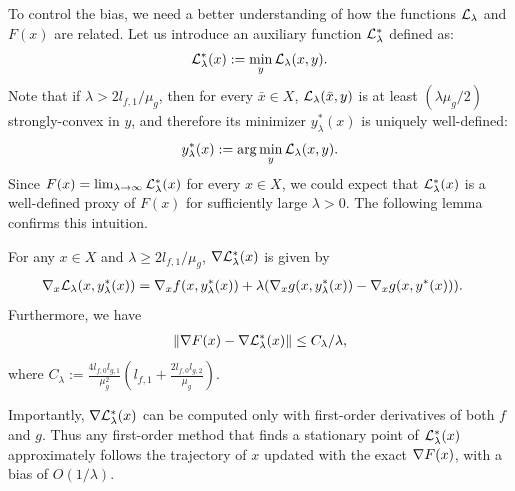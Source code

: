 To control the bias, we need a better understanding of how the functions $\mathcal{L}_{\lambda}$ and $F(x)$ are related. 
Let us introduce an auxiliary function $\mathcal{L}_{\lambda}^*$ defined as:
\begin{align*}
    \mathcal{L}_{\lambda}^*(x) := \min_y \mathcal{L}_\lambda (x,y).
\end{align*}
Note that if $\lambda > 2l_{f,1} / \mu_g$, then for every $\bar{x} \in X$, $\mathcal{L}_{\lambda}(\bar{x},y)$ is at least $(\lambda \mu_g / 2)$ strongly-convex in $y$, and therefore its minimizer $y_{\lambda}^*(x)$ is uniquely well-defined:
\begin{align}
\label{eq:yls}
    y_{\lambda}^*(x) := \arg \min_y \mathcal{L}_{\lambda} (x,y). 
\end{align}
Since $F(x) = \lim_{\lambda \rightarrow \infty} \mathcal{L}_{\lambda}^*(x)$ for every $x \in X$, we could expect that $\mathcal{L}_{\lambda}^*(x)$ is a well-defined proxy of $F(x)$ for sufficiently large $\lambda > 0$.
The following lemma confirms this intuition.
\begin{lemma}
    \label{lemma:l_star_lambda_approximate}
    For any $x \in X$ and $\lambda \ge 2l_{f,1} / \mu_g$, $\nabla \mathcal{L}_{\lambda}^*(x)$ is given by
    \begin{align*}
        \nabla_x \mathcal{L}_{\lambda} (x, y_{\lambda}^*(x)) &= \nabla_x f(x,y_{\lambda}^*(x)) + \lambda (\nabla_x g(x, y_{\lambda}^*(x)) - \nabla_x g(x, y^*(x))).
    \end{align*}
    Furthermore,  we have
    \begin{align*}
        \| \nabla F(x) - \nabla \mathcal{L}_\lambda^*(x) \| \le  C_\lambda / \lambda,
    \end{align*}
    where $C_\lambda := \frac{4 l_{f,0} l_{g,1}}{\mu_g^2} \left( l_{f,1} + \frac{2 l_{f,0} l_{g,2}}{\mu_g} \right)$. 
\end{lemma}
Importantly, $\nabla \mathcal{L}_{\lambda}^*(x)$ can be computed only with first-order derivatives of both $f$ and $g$. Thus any first-order method that finds a stationary point of $\mathcal{L}_{\lambda}^*(x)$ approximately follows the trajectory of $x$ updated with the exact $\nabla F(x)$, with a bias of $O(1/\lambda)$.


